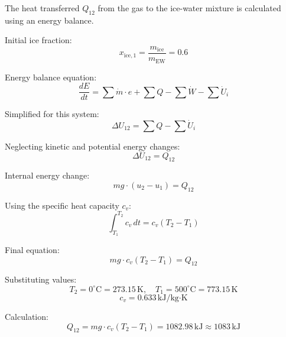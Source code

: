 The heat transferred \( Q_{12} \) from the gas to the ice-water mixture is calculated using an energy balance.  

Initial ice fraction:  
\[
x_{\text{ice},1} = \frac{m_{\text{ice}}}{m_{\text{EW}}} = 0.6
\]

Energy balance equation:  
\[
\frac{dE}{dt} = \sum \dot{m} \cdot e + \sum Q - \sum \dot{W} - \sum \dot{U}_i
\]

Simplified for this system:  
\[
\Delta U_{12} = \sum Q - \sum \dot{U}_i
\]

Neglecting kinetic and potential energy changes:  
\[
\Delta U_{12} = Q_{12}
\]

Internal energy change:  
\[
mg \cdot (u_2 - u_1) = Q_{12}
\]

Using the specific heat capacity \( c_v \):  
\[
\int_{T_1}^{T_2} c_v \, dt = c_v (T_2 - T_1)
\]

Final equation:  
\[
mg \cdot c_v (T_2 - T_1) = Q_{12}
\]

Substituting values:  
\[
T_2 = 0^\circ\text{C} = 273.15 \, \text{K}, \quad T_1 = 500^\circ\text{C} = 773.15 \, \text{K}
\]
\[
c_v = 0.633 \, \text{kJ/kg·K}
\]

Calculation:  
\[
Q_{12} = mg \cdot c_v (T_2 - T_1) = 1082.98 \, \text{kJ} \approx 1083 \, \text{kJ}
\]